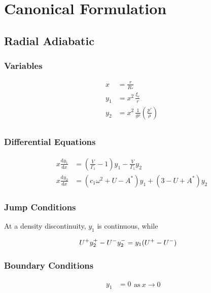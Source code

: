 \documentclass[fleqn]{article}
\newcommand{\diff}{\ensuremath{\mathrm{d}}}
\newcommand{\Vg}{\ensuremath{\frac{V}{\Gamma_{1}}}}
\newcommand{\As}{\ensuremath{A^{\ast}}}
\newcommand{\Rstar}{\ensuremath{R_{\ast}}}
\begin{document}

\section*{Canonical Formulation}

\subsection*{Radial Adiabatic}

\subsubsection*{Variables}

\begin{align*}
x     &= \frac{r}{\Rstar} \\
y_{1} &= x^{2}\, \frac{\xi_{r}}{r} \\
y_{2} &= x^{2}\, \frac{1}{gr} \left( \frac{p'}{\rho} \right) \\
\end{align*}

\subsubsection*{Differential Equations}

\begin{align*}
x \frac{\diff y_{1}}{\diff x} &=
\left(\Vg - 1 \right) y_{1} 
- \Vg y_{2} \\
x \frac{\diff y_{2}}{\diff x} &=
(c_{1} \omega^{2} + U - \As ) y_{1} +
(3 - U + \As) y_{2}
\end{align*}

\subsubsection*{Jump Conditions}

At a density discontinuity, $y_{1}$ is continuous, while

\begin{align*}
U^{\rm +} y_{2}^{+} - U^{-} y_{2}^{-} &= y_{1} (U^{+} - U^{-})
\end{align*}

\subsubsection*{Boundary Conditions}

\begin{equation*}
\begin{aligned}
y_{1} &= 0
\end{aligned}
\text{as}\ x \rightarrow 0
\end{equation*}
\end{document}
